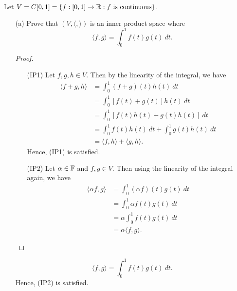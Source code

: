 \documentclass[a4paper]{article}
\begin{document}
\begin{problem}
    Let \( V = C[0,1] = \{ f: [0,1] \to \R : f \ \text{is continuous}  \}  \).
\end{problem}
\begin{enumerate}
    \item[(a)] Prove that \( (V, \langle  ,  \rangle) \) is an inner product space where 
        \[  \langle f , g \rangle = \int_{ 0 }^{ 1 }  f(t) g(t) \ dt. \]
        \begin{proof}
        \begin{enumerate}
            \item[(IP1)] Let \( f,g,h \in V  \). Then by the linearity of the integral, we have 
                \begin{align*}
                    \langle f + g  , h  \rangle &= \int_{ 0 }^{ 1 } (f+g)(t) h(t) \ dt  \\
                                                &= \int_{ 0 }^{ 1 } [f(t) + g(t)] h(t) \ dt \\
                                                &= \int_{ 0 }^{ 1 } [f(t)h(t) + g(t)h(t)] \ dt \\
                                                &= \int_{ 0 }^{ 1 }  f(t) h(t) \ dt + \int_{ 0 }^{ 1 }  g(t)h(t) \ dt \\
                                                &= \langle f , h \rangle + \langle g , h \rangle.
                \end{align*}
                Hence, (IP1) is satisfied.
            \item[(IP2)] Let \( \alpha \in \mathbb{F}  \) and \( f,g \in V  \). Then using the linearity of the integral again, we have
                \begin{align*}
                    \langle \alpha f  ,  g  \rangle &= \int_{ 0 }^{ 1 }  (\alpha f )(t) g(t) \ dt \\
                                                    &= \int_{ 0 }^{ 1 }  \alpha f(t) g(t) \ dt \\
                                                    &= \alpha \int_{ 0 }^{ 1 }  f(t) g(t) \ dt \\
                                                    &= \alpha \langle f , g \rangle.
                \end{align*}
        \end{enumerate}
        \end{proof}
        \[  \langle f , g \rangle = \int_{ 0 }^{ 1 }  f(t) g(t) \ dt. \]
        Hence, (IP2) is satisfied.

\end{enumerate}
\end{document}
